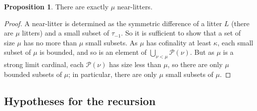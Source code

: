 \documentclass[112pt]{article}
\theoremstyle{definition}
\newtheorem{proposition}[theorem]{Proposition}
\theoremstyle{remark}
\begin{document}
\begin{proposition}\label{def:count_near_litters}
There are exactly $\mu$ near-litters.
\end{proposition}
\begin{comment}
\begin{proof}
A near-litter is determined as the symmetric difference of a litter $L$ (there are $\mu$ litters) and a small subset of
$\tau_{-1}$.

So it is sufficient to show that a set of size $\mu$ has no more than $\mu$ small subsets.  We note that $\mu$ is
a strong limit cardinal of cofinality $\geq\kappa$.  We define a sequence of cardinals and a sequence of functions $f$ indexed by ordinals.
$\mu_0 = 0$.  $f_0$ is the empty function.  $\mu_{\alpha+1}=2^{\mu_\alpha}$.  $f_{\alpha+1}$ is a bijection
to ${\cal P}({\mu_\alpha})$ from the smallest segment in $\mu$ of the correct cardinality whose lower limit is the first ordinal not in the range of $f_{\alpha}$.  For a limit ordinal $\lambda$, $\mu_{\lambda}$ is the supremum of the set of
$\mu_\beta$ for $\beta<\lambda$ and $f_{\lambda}$ is a bijection to ${\cal P}({\mu_\lambda})$ from the smallest
segment in $\mu$ of the correct cardinality whose lower limit is the first ordinal not in the range of any
$f_\beta$ for $\beta<\lambda$.   Because $\mu$ is a strong limit cardinal of cofinality $\geq \kappa$, the first $\alpha$ for which $f_\alpha$ is undefined must be at a limit and satisfy $\alpha \geq \kappa$ and $\mu_\alpha = \mu$.   The union of the maps $f_\alpha$ is a function with domain $\mu$ whose range includes every small subset of $\mu$, because any small subset of $\mu$ must be included as a subset in some $\mu_\alpha<\mu$.
\end{proof}
\end{comment}
\begin{proof}
A near-litter is determined as the symmetric difference of a litter $L$ (there are $\mu$ litters) and a small subset of
$\tau_{-1}$.
So it is sufficient to show that a set of size $\mu$ has no more than $\mu$ small subsets.
As $\mu$ has cofinality at least $\kappa$, each small subset of $\mu$ is bounded, and so is an element of $\bigcup_{\nu < \mu} \mathcal P(\nu)$.
But as $\mu$ is a strong limit cardinal, each $\mathcal P(\nu)$ has size less than $\mu$, so there are only $\mu$ bounded subsets of $\mu$; in particular, there are only $\mu$ small subsets of $\mu$.
\end{proof}

\subsection{Hypotheses for the recursion}\label{ss:hypotheses}
\end{document}
